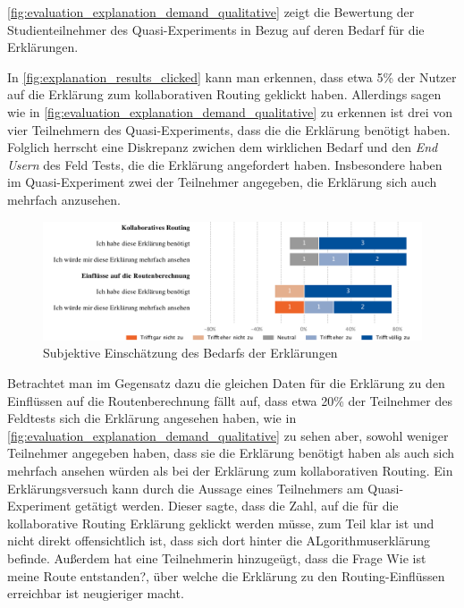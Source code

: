 \autoref{fig:evaluation_explanation_demand_qualitative} zeigt die Bewertung der Studienteilnehmer des Quasi-Experiments in Bezug auf deren Bedarf für die Erklärungen.

In \autoref{fig:explanation_results_clicked} kann man erkennen, dass etwa 5\% der Nutzer auf die Erklärung zum kollaborativen Routing geklickt haben. Allerdings sagen wie in \autoref{fig:evaluation_explanation_demand_qualitative} zu erkennen ist drei von vier Teilnehmern des Quasi-Experiments, dass die die Erklärung benötigt haben. Folglich herrscht eine Diskrepanz zwichen dem wirklichen Bedarf und den \textit{End Usern} des Feld Tests, die die Erklärung angefordert haben. Insbesondere haben im Quasi-Experiment zwei der Teilnehmer angegeben, die Erklärung sich auch mehrfach anzusehen.


\begin{figure}[htb!]
    \centering
    \includegraphics[width=\textwidth]{contents/06_model_evaluation/02_evaluation/res/qualitativeFeedback-evaluation_explanation_demand_qualitative.pdf}
    \caption{Subjektive Einschätzung des Bedarfs der Erklärungen}
    \label{fig:evaluation_explanation_demand_qualitative}
\end{figure}

Betrachtet man im Gegensatz dazu die gleichen Daten für die Erklärung zu den Einflüssen auf die Routenberechnung fällt auf, dass etwa 20\% der Teilnehmer des Feldtests sich die Erklärung angesehen haben, wie in \autoref{fig:evaluation_explanation_demand_qualitative} zu sehen aber, sowohl weniger Teilnehmer angegeben haben, dass sie die Erklärung benötigt haben als auch sich mehrfach ansehen würden als bei der Erklärung zum kollaborativen Routing. Ein Erklärungsversuch kann durch die Aussage eines Teilnehmers am Quasi-Experiment getätigt werden. Dieser sagte, dass die Zahl, auf die für die kollaborative Routing Erklärung geklickt werden müsse, zum Teil klar ist und nicht direkt offensichtlich ist, dass sich dort hinter die ALgorithmuserklärung befinde. Außerdem hat eine Teilnehmerin hinzugeügt, dass die Frage \glqq Wie ist meine Route entstanden?\grqq{}, über welche die Erklärung zu den Routing-Einflüssen erreichbar ist neugieriger macht.

